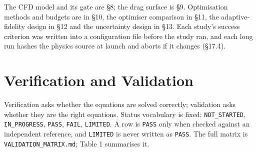 \documentclass[
  a4paper,
  11pt]{article}
\begin{document}
The CFD model and its gate are §8; the drag surface is §9. Optimisation
methods and budgets are in §10, the optimiser comparison in §11, the
adaptive-fidelity design in §12 and the uncertainty design in §13. Each
study's success criterion was written into a configuration file before
the study ran, and each long run hashes the physics source at launch and
aborts if it changes (§17.4).

\section{Verification and Validation}

Verification asks whether the equations are solved correctly; validation
asks whether they are the right equations. Status vocabulary is fixed:
\texttt{NOT\_\allowbreak{}STARTED}, \texttt{IN\_\allowbreak{}PROGRESS},
\texttt{PASS}, \texttt{FAIL}, \texttt{LIMITED}. A row is \texttt{PASS}
only when checked against an independent reference, and \texttt{LIMITED}
is never written as \texttt{PASS}. The full matrix is
\texttt{VALIDATION\_\allowbreak{}MATRIX.md}; Table 1 summarises it.
\end{document}
